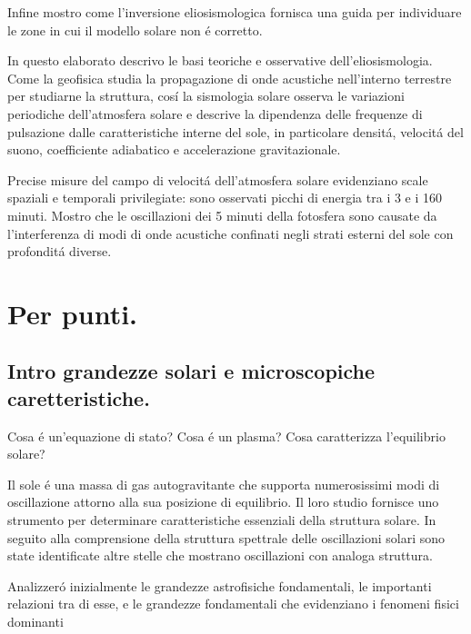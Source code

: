 \documentclass[../main.tex]{subfiles}
\begin{document}
Infine mostro come l'inversione eliosismologica fornisca una guida per individuare le zone in cui il modello solare non \'e corretto.



In questo elaborato descrivo le basi teoriche e osservative dell'eliosismologia. Come la geofisica studia la propagazione di onde acustiche nell'interno terrestre per studiarne la struttura, cos\'i la sismologia solare osserva le variazioni periodiche dell'atmosfera solare e descrive la dipendenza delle frequenze di pulsazione dalle caratteristiche interne del sole, in particolare densit\'a, velocit\'a del suono, coefficiente adiabatico e accelerazione gravitazionale. 



Precise misure del campo di velocit\'a dell'atmosfera solare evidenziano scale spaziali e temporali privilegiate: sono osservati picchi di energia tra i 3 e i 160 minuti. Mostro che le oscillazioni dei 5 minuti della fotosfera sono causate da l'interferenza di modi di onde acustiche confinati negli strati esterni del sole con profondit\'a diverse.

\printbibliography[heading=subbibintoc]


\chapter{Per punti.}
\PartialToc


\section{Intro grandezze solari e microscopiche caretteristiche.}

 Cosa \'e un'equazione di stato? Cosa \'e un plasma? Cosa caratterizza l'equilibrio solare? 

Il sole \'e una massa di gas autogravitante che supporta numerosissimi modi di oscillazione attorno alla sua posizione di equilibrio. Il loro studio fornisce uno strumento per determinare caratteristiche essenziali della struttura solare. In seguito alla comprensione della struttura spettrale delle oscillazioni solari sono state identificate altre stelle che mostrano oscillazioni con analoga struttura.

Analizzer\'o inizialmente le grandezze astrofisiche fondamentali, le importanti relazioni tra di esse, e le grandezze fondamentali che evidenziano i fenomeni fisici dominanti
\end{document}
